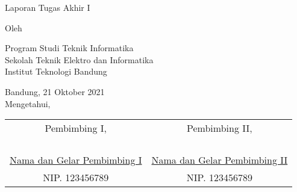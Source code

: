 \clearpage
\pagestyle{empty}

\begin{center}
    \smallskip
    
    \Large \bfseries \MakeUppercase{\thetitle}
    \vfill
    
    \Large Laporan Tugas Akhir I
    \vfill
    
    \large Oleh
    
    \Large \theauthor
    
    \large Program Studi Teknik Informatika \\
    
    \normalsize \normalfont
    Sekolah Teknik Elektro dan Informatika \\
    Institut Teknologi Bandung
    
    \vfill
    \normalsize \normalfont
    Bandung, 21 Oktober 2021 \\
    Mengetahui,
    
    \vspace{0.5cm}
    \setlength{\tabcolsep}{12pt}
    \begin{tabular}{c@{\hskip 0.5in}c}
        Pembimbing I,                           & Pembimbing II,                           \\
                                                &                                          \\
                                                &                                          \\
                                                &                                          \\
                                                &                                          \\
        \underline{Nama dan Gelar Pembimbing I} & \underline{Nama dan Gelar Pembimbing II} \\
        NIP. 123456789                          & NIP. 123456789                           \\
    \end{tabular}
    
\end{center}
\clearpage
